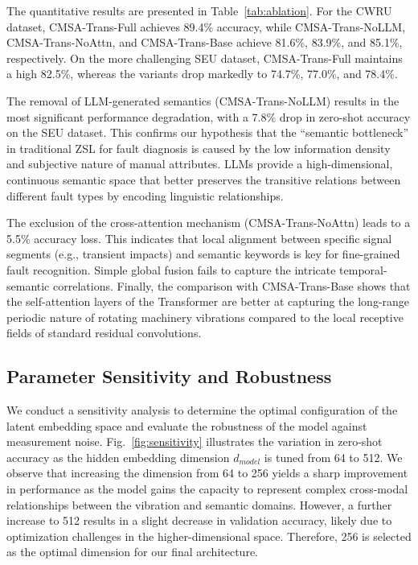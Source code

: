 \documentclass[journal]{IEEEtran}
\begin{document}
The quantitative results are presented in Table~\ref{tab:ablation}. For the CWRU dataset, CMSA-Trans-Full achieves 89.4\% accuracy, while CMSA-Trans-NoLLM, CMSA-Trans-NoAttn, and CMSA-Trans-Base achieve 81.6\%, 83.9\%, and 85.1\%, respectively. On the more challenging SEU dataset, CMSA-Trans-Full maintains a high 82.5\%, whereas the variants drop markedly to 74.7\%, 77.0\%, and 78.4\%.



The removal of LLM-generated semantics (CMSA-Trans-NoLLM) results in the most significant performance degradation, with a 7.8\% drop in zero-shot accuracy on the SEU dataset. This confirms our hypothesis that the ``semantic bottleneck'' in traditional ZSL for fault diagnosis is caused by the low information density and subjective nature of manual attributes. LLMs provide a high-dimensional, continuous semantic space that better preserves the transitive relations between different fault types by encoding linguistic relationships.

The exclusion of the cross-attention mechanism (CMSA-Trans-NoAttn) leads to a 5.5\% accuracy loss. This indicates that local alignment between specific signal segments (e.g., transient impacts) and semantic keywords is key for fine-grained fault recognition. Simple global fusion fails to capture the intricate temporal-semantic correlations. Finally, the comparison with CMSA-Trans-Base shows that the self-attention layers of the Transformer are better at capturing the long-range periodic nature of rotating machinery vibrations compared to the local receptive fields of standard residual convolutions.

\subsection{Parameter Sensitivity and Robustness}

We conduct a sensitivity analysis to determine the optimal configuration of the latent embedding space and evaluate the robustness of the model against measurement noise. Fig.~\ref{fig:sensitivity} illustrates the variation in zero-shot accuracy as the hidden embedding dimension $d_{model}$ is tuned from 64 to 512. We observe that increasing the dimension from 64 to 256 yields a sharp improvement in performance as the model gains the capacity to represent complex cross-modal relationships between the vibration and semantic domains. However, a further increase to 512 results in a slight decrease in validation accuracy, likely due to optimization challenges in the higher-dimensional space. Therefore, 256 is selected as the optimal dimension for our final architecture.
\end{document}
